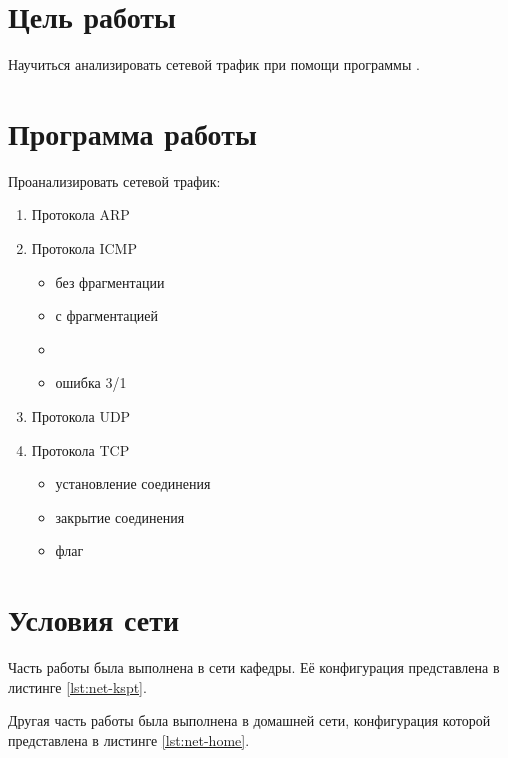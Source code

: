 





\tableofcontents
\listoffigures
\lstlistoflistings
\newpage

\section{Цель работы}

Научиться анализировать сетевой трафик при помощи программы .

\section{Программа работы}

Проанализировать сетевой трафик:

\begin{enumerate}
	\item Протокола ARP
	\item Протокола ICMP
	\begin{itemize}
		\item {} без фрагментации
		\item {} с фрагментацией
		\item {}
		\item ошибка 3/1
	\end{itemize}
	\item Протокола UDP
	\item Протокола TCP
	\begin{itemize}
		\item установление соединения
		\item закрытие соединения
		\item флаг 
	\end{itemize}
\end{enumerate}

\section{Условия сети}

Часть работы была выполнена в сети кафедры. Её конфигурация представлена в листинге \ref{lst:net-kspt}.




Другая часть работы была выполнена в домашней сети, конфигурация которой представлена в листинге \ref{lst:net-home}.

